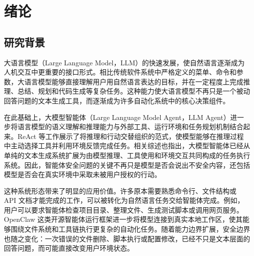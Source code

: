 
\chapter{绪论}

\section{研究背景}

大语言模型（Large Language Model，LLM）的快速发展，使自然语言逐渐成为人机交互中更重要的接口形式。相比传统软件系统中严格定义的菜单、命令和参数，大语言模型能够直接理解用户用自然语言表达的目标，并在一定程度上完成推理、总结、规划和代码生成等复杂任务。这种能力使大语言模型不再只是一个被动回答问题的文本生成工具，而逐渐成为许多自动化系统中的核心决策组件。

在此基础上，大模型智能体（Large Language Model Agent，LLM Agent）进一步将语言模型的语义理解和推理能力与外部工具、运行环境和任务规划机制结合起来。ReAct 等工作展示了将推理和行动交替组织的范式，使模型能够在推理过程中主动选择工具并利用环境反馈完成任务\cite{yao2022react}。相关综述也指出，大模型智能体已经从单纯的文本生成系统扩展为由模型推理、工具使用和环境交互共同构成的任务执行系统\cite{wang2024survey}。因此，智能体安全问题的关键不再只是模型是否会说出不安全内容，还包括模型是否会在真实环境中采取未被用户授权的行动。

这种系统形态带来了明显的应用价值。许多原本需要熟悉命令行、文件结构或 API 文档才能完成的工作，可以被转化为自然语言任务交给智能体完成。例如，用户可以要求智能体检查项目目录、整理文件、生成测试脚本或调用网页服务。OpenClaw 这类开源智能体运行框架进一步将模型连接到真实本地工作区，使其能够围绕文件系统和工具链执行更复杂的自动化任务\cite{openclaw2026github}。随着能力边界扩展，安全边界也随之变化：一次错误的文件删除、脚本执行或配置修改，已经不只是文本层面的回答问题，而可能直接改变用户环境状态。

